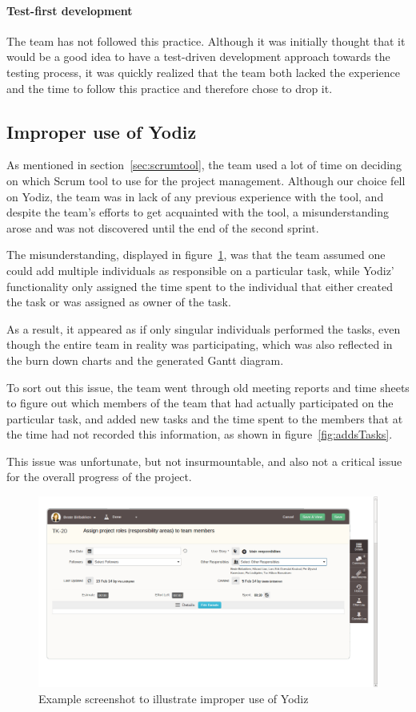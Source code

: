 \paragraph{Test-first development}
The team has not followed this practice. Although it was initially thought that it would be a good idea to have a test-driven development approach towards the testing process, it was quickly realized that the team both lacked the experience and the time to follow this practice and therefore chose to drop it.


\subsection{Improper use of Yodiz}
\label{sec:improperScrum}
As mentioned in section~\ref{sec:scrumtool}, the team used a lot of time on
deciding on which Scrum tool to use for the project management. Although our
choice fell on Yodiz, the team was in lack of any previous experience with the
tool, and despite the team's efforts to get acquainted with the tool, a
misunderstanding arose and was not discovered until the end of the second
sprint.

The misunderstanding, displayed in figure~\ref{fig:wrongUse}, was that the team
assumed one could add multiple individuals as responsible on a particular task,
while Yodiz' functionality only assigned the time spent to the individual that
either created the task or was assigned as owner of the task.

As a result, it appeared as if only singular individuals performed the tasks,
even though the entire team in reality was participating, which was also
reflected in the burn down charts and the generated Gantt diagram. 

To sort out this issue, the team went through old meeting reports and time sheets
to figure out which members of the team that had actually participated on the
particular task, and added new tasks and the time spent to the members that at
the time had not recorded this information, as shown in
figure~\ref{fig:addsTasks}.

This issue was unfortunate, but not insurmountable, and also not a critical
issue for the overall progress of the project.

\begin{figure}[H]
\includegraphics[width=\textwidth]{ch/devProcess/fig/wrongUse.png}
\caption{Example screenshot to illustrate improper use of Yodiz}
\label{fig:wrongUse}
\end{figure}

